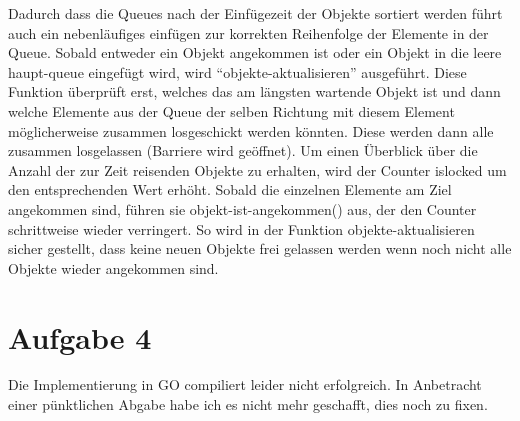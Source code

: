 \documentclass[11pt,a4paper,DIV=10,]{scrartcl}
\begin{document}
Dadurch dass die Queues nach der Einfügezeit der Objekte sortiert werden führt auch ein nebenläufiges einfügen zur korrekten Reihenfolge der Elemente in der Queue. Sobald entweder ein Objekt angekommen ist oder ein Objekt in die leere haupt-queue eingefügt wird, wird ``objekte-aktualisieren'' ausgeführt.
Diese Funktion überprüft erst, welches das am längsten wartende Objekt ist und dann welche Elemente aus der Queue der selben Richtung mit diesem Element möglicherweise zusammen losgeschickt werden könnten. Diese werden dann alle zusammen losgelassen (Barriere wird geöffnet). Um einen Überblick über die 
Anzahl der zur Zeit reisenden Objekte zu erhalten, wird der Counter islocked um den entsprechenden Wert erhöht. Sobald die einzelnen Elemente am Ziel angekommen sind, führen sie objekt-ist-angekommen() aus, der den Counter schrittweise wieder verringert. So wird in der Funktion objekte-aktualisieren sicher gestellt, dass keine neuen Objekte frei gelassen werden wenn noch nicht alle Objekte wieder angekommen sind. 

\section*{Aufgabe 4}
Die Implementierung in GO compiliert leider nicht erfolgreich. In Anbetracht einer pünktlichen Abgabe habe ich es nicht mehr geschafft, dies noch zu fixen. 

\end{document}
